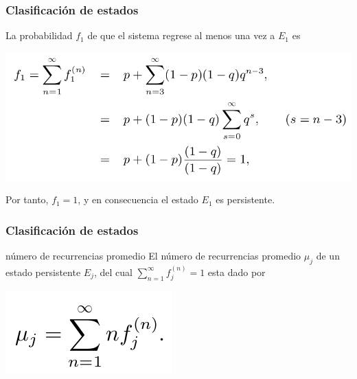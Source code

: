 \documentclass[spanish]{beamer}
\begin{document}
\begin{frame}
\frametitle{Clasificación de estados}
La probabilidad $f_{1}$ de que el sistema regrese al menos una vez a $E_{1}$ es

\begin{center}
\includegraphics[scale=0.35]{im41}
\end{center}

Por tanto, $f_{1} = 1$, y en consecuencia el estado $E_1$ es persistente.

\end{frame}
\begin{frame}
\frametitle{Clasificación de estados}

\begin{block}{número de recurrencias promedio}
El número de recurrencias promedio $\mu_{j}$ de un estado persistente $E_{j}$, del cual $\sum_{n=1}^{\infty} f_{j}^{(n)}=1$ esta dado por 

\begin{center}
\includegraphics[scale=0.35]{im42}
\end{center}

\end{block}

\end{frame}
\end{document}
